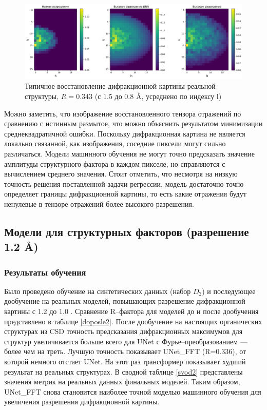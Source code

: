 \begin{figure}[H]
    \centering
    \includegraphics[width=1\textwidth]{figures/real.png}
    \caption{Типичное восстановление дифракционной картины реальной структуры, $R = 0.343$ (с 1.5 до 0.8 \AA, усреднено по индексу l)}
    \label{recon_ex}
\end{figure}

Можно заметить, что изображение восстановленного тензора отражений по сравнению с истинным размытое, что можно объяснить результатом минимизации среднеквадратичной ошибки. Поскольку дифракционная картина не является локально связанной, как изображения, соседние пиксели могут сильно различаться. Модели машинного обучения не могут точно предсказать значение амплитуды структурного фактора в каждом пикселе, но справляются с вычислением среднего значения. Стоит отметить, что несмотря на низкую точность решения поставленной задачи регрессии, модель достаточно точно определяет границы дифракционной картины, то есть какие отражения будут ненулевые в тензоре отражений более высокого разрешения.

\subsection{Модели для структурных факторов (разрешение 1.2 \AA)}


\subsubsection{Результаты обучения}

Было проведено обучение на синтетических данных (набор $D_2$) и последующее дообучение на реальных моделей, повышающих разрешение дифракционной картины с 1.2 до 1.0 \text{\AA}. Сравнение R--фактора для моделей до и после дообучения представлено в таблице \ref{doposle2}. После дообучение на настоящих органических структурах из CSD точность предсказания дифракционных максимумов для структур увеличивается больше всего для UNet с Фурье--преобразованием --- более чем на треть. Лучшую точность показывает UNet\_FFT (R=0.336), от которой немного отстает UNet. На этот раз трансформер показывает худший результат на реальных структурах. В сводной таблице \ref{svod2} представлены значения метрик на реальных данных финальных моделей. Таким образом, UNet\_FFT снова становится наиболее точной моделью машинного обучения для увеличения разрешения дифракционной картины. 

